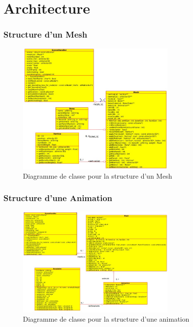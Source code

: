 \documentclass[10pt]{beamer}
\begin{document}
\section{Architecture}
\begin{frame}
\frametitle{Structure d'un Mesh}
\begin{figure}[H]
    \begin{center}
        \includegraphics[width=0.7\textwidth]{MeshStructure.jpg}
        \caption{Diagramme de classe pour la structure d'un Mesh}
    \end{center}
\end{figure}
\end{frame}

\begin{frame}
\frametitle{Structure d'une Animation}
\begin{figure}[H]
    \begin{center}
        \includegraphics[width=0.7\textwidth]{AnimStructure.jpg}
        \caption{Diagramme de classe pour la structure d'une animation}
    \end{center}
\end{figure}
\end{frame}
\end{document}
